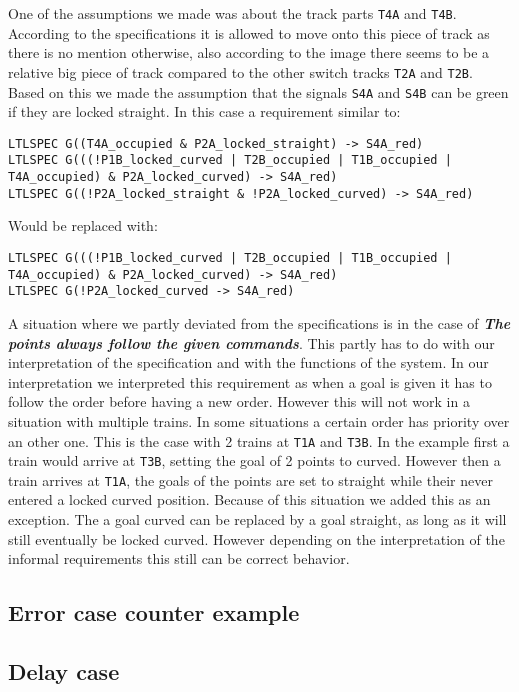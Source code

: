 \documentclass[a4paper]{article}
\begin{document}
	One of the assumptions we made was about the track parts \texttt{T4A} and \texttt{T4B}. According to the specifications it is allowed to move onto this piece of track as there is no mention otherwise, also according to the image there seems to be a relative big piece of track compared to the other switch tracks \texttt{T2A} and \texttt{T2B}. Based on this we made the assumption that the signals \texttt{S4A} and \texttt{S4B} can be green if they are locked straight. In this case a requirement similar to:
	\begin{lstlisting}
LTLSPEC G((T4A_occupied & P2A_locked_straight) -> S4A_red)
LTLSPEC G(((!P1B_locked_curved | T2B_occupied | T1B_occupied | T4A_occupied) & P2A_locked_curved) -> S4A_red)
LTLSPEC G((!P2A_locked_straight & !P2A_locked_curved) -> S4A_red)
	\end{lstlisting}
	Would be replaced with:
	\begin{lstlisting}
LTLSPEC G(((!P1B_locked_curved | T2B_occupied | T1B_occupied | T4A_occupied) & P2A_locked_curved) -> S4A_red)
LTLSPEC G(!P2A_locked_curved -> S4A_red)
	\end{lstlisting}
	
	A situation where we partly deviated from the specifications is in the case of \textit{\textbf{The points always follow the given commands}}. This partly has to do with our interpretation of the specification and with the functions of the system. In our interpretation we interpreted this requirement as when a goal is given it has to follow the order before having a new order. However this will not work in a situation with multiple trains. In some situations a certain order has priority over an other one. This is the case with 2 trains at \texttt{T1A} and \texttt{T3B}. In the example first a train would arrive at \texttt{T3B}, setting the goal of 2 points to curved. However then a train arrives at \texttt{T1A}, the goals of the points are set to straight while their never entered a locked curved position.
	Because of this situation we added this as an exception. The a goal curved can be replaced by a goal straight, as long as it will still eventually be locked curved. However depending on the interpretation of the informal requirements this still can be correct behavior.
	
	\subsection{Error case counter example}
	
	
	\subsection{Delay case}
	
\end{document}
